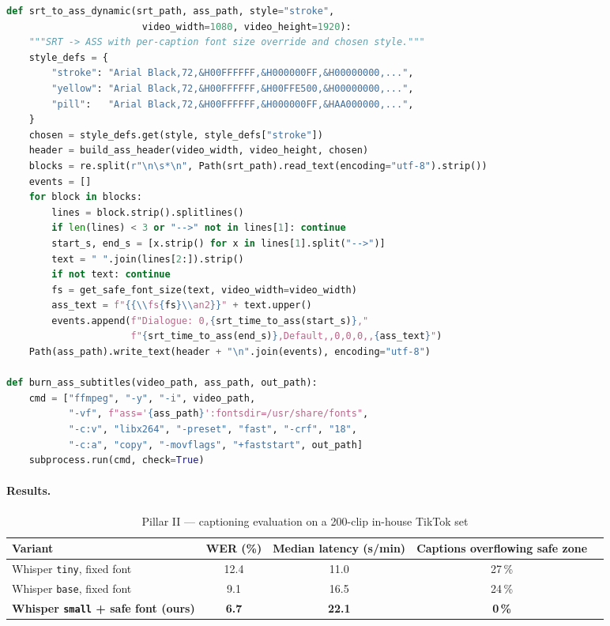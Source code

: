 \begin{lstlisting}[language=Python, caption={Pillar II --- core captioning pipeline (excerpt from \texttt{ai\_module/speechtotext.py})}, label={lst:pillar2}]
def srt_to_ass_dynamic(srt_path, ass_path, style="stroke",
                        video_width=1080, video_height=1920):
    """SRT -> ASS with per-caption font size override and chosen style."""
    style_defs = {
        "stroke": "Arial Black,72,&H00FFFFFF,&H000000FF,&H00000000,...",
        "yellow": "Arial Black,72,&H00FFFFFF,&H00FFE500,&H00000000,...",
        "pill":   "Arial Black,72,&H00FFFFFF,&H000000FF,&HAA000000,...",
    }
    chosen = style_defs.get(style, style_defs["stroke"])
    header = build_ass_header(video_width, video_height, chosen)
    blocks = re.split(r"\n\s*\n", Path(srt_path).read_text(encoding="utf-8").strip())
    events = []
    for block in blocks:
        lines = block.strip().splitlines()
        if len(lines) < 3 or "-->" not in lines[1]: continue
        start_s, end_s = [x.strip() for x in lines[1].split("-->")]
        text = " ".join(lines[2:]).strip()
        if not text: continue
        fs = get_safe_font_size(text, video_width=video_width)
        ass_text = f"{{\\fs{fs}\\an2}}" + text.upper()
        events.append(f"Dialogue: 0,{srt_time_to_ass(start_s)},"
                      f"{srt_time_to_ass(end_s)},Default,,0,0,0,,{ass_text}")
    Path(ass_path).write_text(header + "\n".join(events), encoding="utf-8")

def burn_ass_subtitles(video_path, ass_path, out_path):
    cmd = ["ffmpeg", "-y", "-i", video_path,
           "-vf", f"ass='{ass_path}':fontsdir=/usr/share/fonts",
           "-c:v", "libx264", "-preset", "fast", "-crf", "18",
           "-c:a", "copy", "-movflags", "+faststart", out_path]
    subprocess.run(cmd, check=True)
\end{lstlisting}

\paragraph{Results.}

\begin{table}[H]
\centering
\caption{Pillar II --- captioning evaluation on a 200-clip in-house TikTok set}
\label{tab:pillar2_metrics}
\small
\begin{tabular}{lcccc}
\toprule
Variant & WER (\%) & Median latency (s/min) & Captions overflowing safe zone \\
\midrule
Whisper \texttt{tiny}, fixed font          & 12.4 & 11.0 & 27\,\%  \\
Whisper \texttt{base}, fixed font          &  9.1 & 16.5 & 24\,\%  \\
\textbf{Whisper \texttt{small} + safe font (ours)} & \textbf{6.7} & \textbf{22.1} & \textbf{0\,\%} \\
\bottomrule
\end{tabular}
\end{table}

